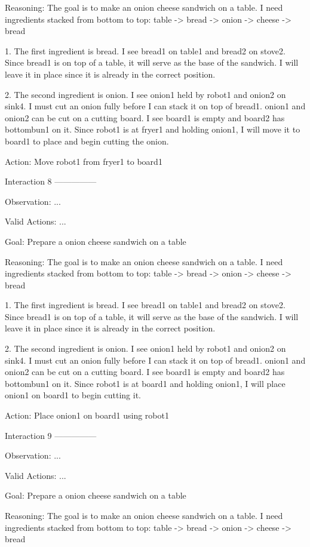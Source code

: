 Reasoning: The goal is to make an onion cheese sandwich on a table. I need ingredients stacked from bottom to top: table -> bread -> onion -> cheese -> bread

1. The first ingredient is bread. I see bread1 on table1 and bread2 on stove2. Since bread1 is on top of a table, it will serve as the base of the sandwich. I will leave it in place since it is already in the correct position.

2. The second ingredient is onion. I see onion1 held by robot1 and onion2 on sink4. I must cut an onion fully before I can stack it on top of bread1. onion1 and onion2 can be cut on a cutting board. I see board1 is empty and board2 has bottombun1 on it. Since robot1 is at fryer1 and holding onion1, I will move it to board1 to place and begin cutting the onion.

Action: Move robot1 from fryer1 to board1


Interaction 8
---------------


Observation:
...

Valid Actions:
...

Goal: Prepare a onion cheese sandwich on a table


Reasoning: The goal is to make an onion cheese sandwich on a table. I need ingredients stacked from bottom to top: table -> bread -> onion -> cheese -> bread

1. The first ingredient is bread. I see bread1 on table1 and bread2 on stove2. Since bread1 is on top of a table, it will serve as the base of the sandwich. I will leave it in place since it is already in the correct position.

2. The second ingredient is onion. I see onion1 held by robot1 and onion2 on sink4. I must cut an onion fully before I can stack it on top of bread1. onion1 and onion2 can be cut on a cutting board. I see board1 is empty and board2 has bottombun1 on it. Since robot1 is at board1 and holding onion1, I will place onion1 on board1 to begin cutting it.

Action: Place onion1 on board1 using robot1


Interaction 9
---------------


Observation:
...

Valid Actions:
...

Goal: Prepare a onion cheese sandwich on a table


Reasoning: The goal is to make an onion cheese sandwich on a table. I need ingredients stacked from bottom to top: table -> bread -> onion -> cheese -> bread


